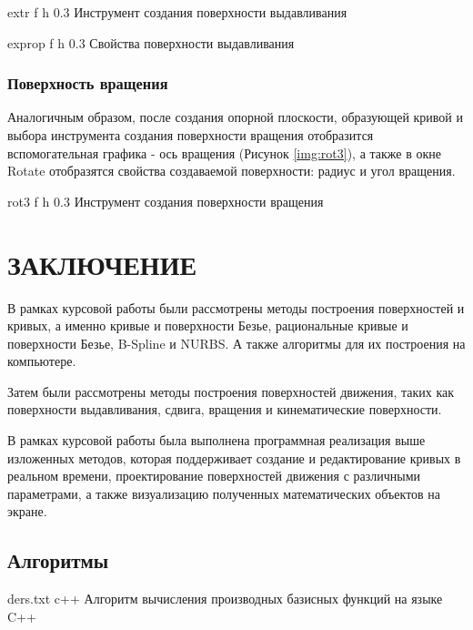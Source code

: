 \documentclass{bmstu}
\begin{document}
{extr} %
{f} %
{h} %
{0.3\textwidth} %
{Инструмент создания поверхности выдавливания} %

{exprop} %
{f} %
{h} %
{0.3\textwidth} %
{Свойства поверхности выдавливания} %

\subsection{Поверхность вращения}

Аналогичным образом, после создания опорной плоскости, образующей кривой и выбора инструмента создания поверхности вращения отобразится вспомогательная графика - ось вращения (Рисунок \ref{img:rot3}), а также в окне Rotate отобразятся свойства создаваемой поверхности: радиус и угол вращения.

{rot3} %
{f} %
{h} %
{0.3\textwidth} %
{Инструмент создания поверхности вращения} %


\chapter*{ЗАКЛЮЧЕНИЕ}

В рамках курсовой работы были рассмотрены методы построения поверхностей и кривых, а именно  кривые и поверхности Безье, рациональные кривые и поверхности Безье, B-Spline и NURBS. А также алгоритмы для их построения на компьютере.

Затем были рассмотрены методы построения поверхностей движения, таких как поверхности выдавливания, сдвига, вращения и кинематические поверхности.

В рамках курсовой работы была выполнена программная реализация выше изложенных методов, которая поддерживает создание и редактирование кривых в реальном времени, проектирование поверхностей движения с различными параметрами, а также визуализацию полученных математических объектов на экране.

\makebibliography

\begin{appendices}
	\chapter{Алгоритмы}
{ders.txt} %
{c++} %
{Алгоритм вычисления производных базисных функций на языке C++} %

\end{appendices}
\end{document}
